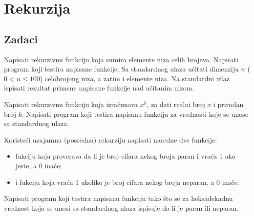 
\chapter{Rekurzija}

\section{Zadaci}

\begin{Exercise}[label=101]
Napisati rekurzivnu funkciju koja sumira elemente niza celih brojeva.  Napisati program koji testira napisane funkcije. Sa standardnog ulaza učitati dimenziju $n$  ($0 < n \leq 100$) celobrojong
niza, a zatim i elemente niza. Na standardni izlaz ispisati
rezultat primene napisane funkcije nad učitanim
nizom.
\end{Exercise}
\begin{Answer}[ref=101]
\end{Answer}

\begin{Exercise}[label=102]
 Napisati rekurzivnu funkciju koja izračunava  $x^k$,  za dati realni broj $x$ i prirodan broj $k$. Napisati program koji testira napisanu funkciju za vrednosti koje se unose sa standardnog ulaza.
\end{Exercise}
\begin{Answer}[ref=102]
\end{Answer}

\begin{Exercise}[label=104]
 Koristeći uzajamnu (posrednu) rekurziju napisati naredne dve funkcije:
 \begin{itemize}
\item fukciju  koja proverava da li je broj cifara nekog broja paran i vraća 1 ako jeste, a 0 inače;
\item i fukciju  koja vraća 1 ukoliko je broj cifara nekog broja neparan, a 0 inače.
 \end{itemize}
 Napisati program koji testira napisanu funkciju tako što se za heksadekadnu vrednost koja se unosi sa standardnog ulaza ispisuje da li je paran ili neparan.
\end{Exercise}
\begin{Answer}[ref=104]
\end{Answer}

